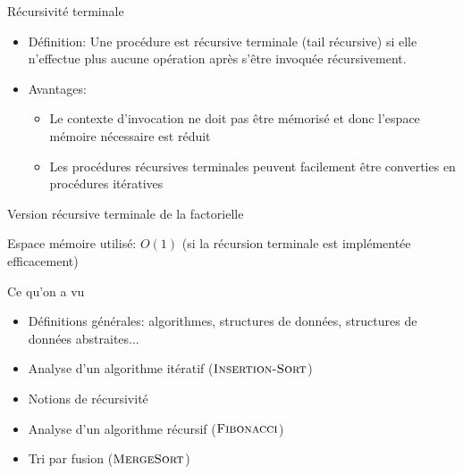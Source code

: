 \begin{frame}{Récursivité terminale}

\begin{itemize}
\item Définition: Une procédure est \alert{récursive terminale} (tail récursive) si elle n'effectue plus aucune opération après s'être invoquée récursivement.

\bigskip

\item Avantages:
\begin{itemize}
\item Le contexte d'invocation ne doit pas être mémorisé et donc l'espace mémoire nécessaire est réduit
\item Les procédures récursives terminales peuvent facilement être converties en procédures itératives
\end{itemize}
\end{itemize}

\end{frame}

\begin{frame}{Version récursive terminale de la factorielle}

\begin{center}
\end{center}

\begin{center}
\end{center}

\bigskip

Espace mémoire utilisé: $O(1)$ (si la récursion terminale est implémentée efficacement)

\end{frame}

\begin{frame}{Ce qu'on a vu}

\begin{itemize}
\item Définitions générales: algorithmes, structures de données, structures de données abstraites...
\item Analyse d'un algorithme itératif ($\textnormal{\scshape Insertion-Sort}$)
\item Notions de récursivité
\item Analyse d'un algorithme récursif ($\textnormal{\scshape Fibonacci}$)
\item Tri par fusion ($\textnormal{\scshape MergeSort}$)
\end{itemize}

\end{frame}
